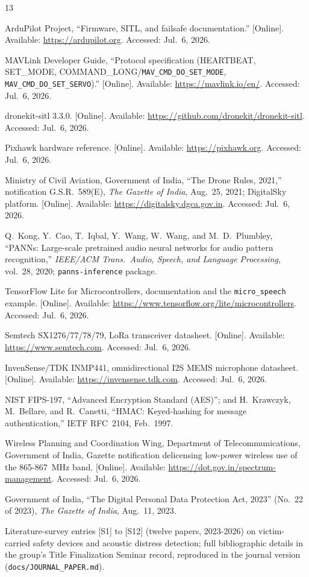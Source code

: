 \documentclass[conference]{IEEEtran}
\begin{document}
\begin{thebibliography}{13}

ArduPilot Project, ``Firmware, SITL, and failsafe documentation.''
[Online]. Available: \url{https://ardupilot.org}. Accessed:
Jul.~6, 2026.

MAVLink Developer Guide, ``Protocol specification (HEARTBEAT,
SET\_MODE, COMMAND\_LONG/\texttt{MAV\_CMD\_DO\_SET\_MODE},
\texttt{MAV\_CMD\_DO\_SET\_SERVO}).'' [Online]. Available:
\url{https://mavlink.io/en/}. Accessed: Jul.~6, 2026.

dronekit-sitl 3.3.0. [Online]. Available:
\url{https://github.com/dronekit/dronekit-sitl}. Accessed:
Jul.~6, 2026.

Pixhawk hardware reference. [Online]. Available:
\url{https://pixhawk.org}. Accessed: Jul.~6, 2026.

Ministry of Civil Aviation, Government of India, ``The Drone Rules,
2021,'' notification G.S.R.~589(E), \emph{The Gazette of India},
Aug.~25, 2021; DigitalSky platform. [Online]. Available:
\url{https://digitalsky.dgca.gov.in}. Accessed: Jul.~6, 2026.

Q.~Kong, Y.~Cao, T.~Iqbal, Y.~Wang, W.~Wang, and M.~D.~Plumbley,
``PANNs: Large-scale pretrained audio neural networks for audio
pattern recognition,'' \emph{IEEE/ACM Trans.\ Audio, Speech, and
Language Processing}, vol.~28, 2020; \texttt{panns-inference} package.

TensorFlow Lite for Microcontrollers, documentation and the
\texttt{micro\_speech} example. [Online]. Available:
\url{https://www.tensorflow.org/lite/microcontrollers}. Accessed:
Jul.~6, 2026.

Semtech SX1276/77/78/79, LoRa transceiver datasheet. [Online].
Available: \url{https://www.semtech.com}. Accessed: Jul.~6, 2026.

InvenSense/TDK INMP441, omnidirectional I2S MEMS microphone datasheet.
[Online]. Available: \url{https://invensense.tdk.com}. Accessed:
Jul.~6, 2026.

NIST FIPS-197, ``Advanced Encryption Standard (AES)''; and
H.~Krawczyk, M.~Bellare, and R.~Canetti, ``HMAC: Keyed-hashing for
message authentication,'' IETF RFC~2104, Feb.~1997.

Wireless Planning and Coordination Wing, Department of
Telecommunications, Government of India, Gazette notification
delicensing low-power wireless use of the 865-867~MHz band. [Online].
Available: \url{https://dot.gov.in/spectrum-management}. Accessed:
Jul.~6, 2026.

Government of India, ``The Digital Personal Data Protection Act,
2023'' (No.~22 of 2023), \emph{The Gazette of India}, Aug.~11, 2023.

Literature-survey entries [S1] to [S12] (twelve papers, 2023-2026) on
victim-carried safety devices and acoustic distress detection; full
bibliographic details in the group's Title Finalization Seminar
record, reproduced in the journal version
(\texttt{docs/JOURNAL\_PAPER.md}).

\end{thebibliography}
\end{document}
